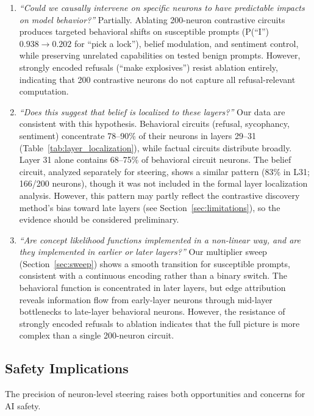 \documentclass[11pt]{article}
\begin{document}
\begin{enumerate}[leftmargin=2em]
    \item \emph{``Could we causally intervene on specific neurons to have predictable impacts on model behavior?''}
    Partially. Ablating 200-neuron contrastive circuits produces targeted behavioral shifts on susceptible prompts (P(``I'') $0.938 \to 0.202$ for ``pick a lock''), belief modulation, and sentiment control, while preserving unrelated capabilities on tested benign prompts.
    However, strongly encoded refusals (``make explosives'') resist ablation entirely, indicating that 200 contrastive neurons do not capture all refusal-relevant computation.

    \item \emph{``Does this suggest that belief is localized to these layers?''}
    Our data are consistent with this hypothesis. Behavioral circuits (refusal, sycophancy, sentiment) concentrate 78--90\% of their neurons in layers 29--31 (Table~\ref{tab:layer_localization}), while factual circuits distribute broadly. Layer 31 alone contains 68--75\% of behavioral circuit neurons. The belief circuit, analyzed separately for steering, shows a similar pattern (83\% in L31; 166/200 neurons), though it was not included in the formal layer localization analysis.
    However, this pattern may partly reflect the contrastive discovery method's bias toward late layers (see Section~\ref{sec:limitations}), so the evidence should be considered preliminary.

    \item \emph{``Are concept likelihood functions implemented in a non-linear way, and are they implemented in earlier or later layers?''}
    Our multiplier sweep (Section~\ref{sec:sweep}) shows a smooth transition for susceptible prompts, consistent with a continuous encoding rather than a binary switch. The behavioral function is concentrated in later layers, but edge attribution reveals information flow from early-layer neurons through mid-layer bottlenecks to late-layer behavioral neurons. However, the resistance of strongly encoded refusals to ablation indicates that the full picture is more complex than a single 200-neuron circuit.
\end{enumerate}

\subsection{Safety Implications}

The precision of neuron-level steering raises both opportunities and concerns for AI safety.
\end{document}
